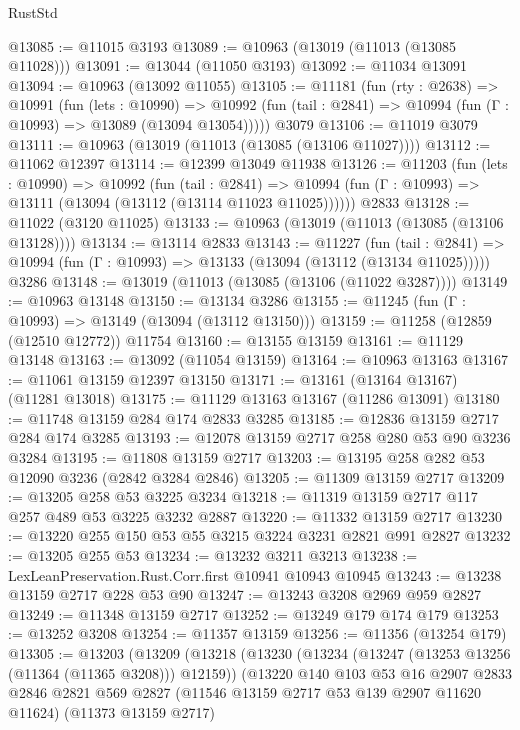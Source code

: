 \begin{lexlean}{RustStd}
\begin{coremodule}
@13085 := @11015 @3193
@13089 := @10963 (@13019 (@11013 (@13085 @11028)))
@13091 := @13044 (@11050 @3193)
@13092 := @11034 @13091
@13094 := @10963 (@13092 @11055)
@13105 := @11181
    (fun (rty : @2638) =>
    @10991
      (fun (lets : @10990) =>
      @10992 (fun (tail : @2841) => @10994 (fun (Γ : @10993) => @13089 (@13094 @13054)))))
    @3079
@13106 := @11019 @3079
@13111 := @10963 (@13019 (@11013 (@13085 (@13106 @11027))))
@13112 := @11062 @12397
@13114 := @12399 @13049 @11938
@13126 := @11203
    (fun (lets : @10990) =>
    @10992
      (fun (tail : @2841) =>
      @10994 (fun (Γ : @10993) => @13111 (@13094 (@13112 (@13114 @11023 @11025))))))
    @2833
@13128 := @11022 (@3120 @11025)
@13133 := @10963 (@13019 (@11013 (@13085 (@13106 @13128))))
@13134 := @13114 @2833
@13143 := @11227
    (fun (tail : @2841) => @10994 (fun (Γ : @10993) => @13133 (@13094 (@13112 (@13134 @11025)))))
    @3286
@13148 := @13019 (@11013 (@13085 (@13106 (@11022 @3287))))
@13149 := @10963 @13148
@13150 := @13134 @3286
@13155 := @11245 (fun (Γ : @10993) => @13149 (@13094 (@13112 @13150)))
@13159 := @11258 (@12859 (@12510 @12772)) @11754
@13160 := @13155 @13159
@13161 := @11129 @13148
@13163 := @13092 (@11054 @13159)
@13164 := @10963 @13163
@13167 := @11061 @13159 @12397 @13150
@13171 := @13161 (@13164 @13167) (@11281 @13018)
@13175 := @11129 @13163 @13167 (@11286 @13091)
@13180 := @11748 @13159 @284 @174 @2833 @3285
@13185 := @12836 @13159 @2717 @284 @174 @3285
@13193 := @12078 @13159 @2717 @258 @280 @53 @90 @3236 @3284
@13195 := @11808 @13159 @2717
@13203 := @13195 @258 @282 @53 @12090 @3236 (@2842 @3284 @2846)
@13205 := @11309 @13159 @2717
@13209 := @13205 @258 @53 @3225 @3234
@13218 := @11319 @13159 @2717 @117 @257 @489 @53 @3225 @3232 @2887
@13220 := @11332 @13159 @2717
@13230 := @13220 @255 @150 @53 @55 @3215 @3224 @3231 @2821 @991 @2827
@13232 := @13205 @255 @53
@13234 := @13232 @3211 @3213
@13238 := LexLeanPreservation.Rust.Corr.first @10941 @10943 @10945
@13243 := @13238 @13159 @2717 @228 @53 @90
@13247 := @13243 @3208 @2969 @959 @2827
@13249 := @11348 @13159 @2717
@13252 := @13249 @179 @174 @179
@13253 := @13252 @3208
@13254 := @11357 @13159
@13256 := @11356 (@13254 @179)
@13305 := @13203
    (@13209
      (@13218
        (@13230
          (@13234 (@13247 (@13253 @13256 (@11364 (@11365 @3208))) @12159))
          (@13220
            @140
            @103
            @53
            @16
            @2907
            @2833
            @2846
            @2821
            @569
            @2827
            (@11546 @13159 @2717 @53 @139 @2907 @11620 @11624)
            (@11373 @13159 @2717)

\end{coremodule}
\end{lexlean}
